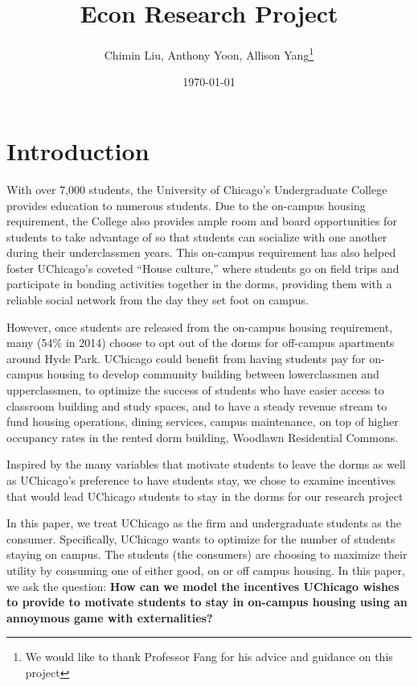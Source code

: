 \documentclass[12pt]{article}
\title{Econ Research Project}
\author{Chimin Liu, Anthony Yoon, Allison Yang\thanks{We would like to thank Professor Fang for his advice and guidance on this project}}
\date{\today}
\begin{document}
\maketitle
\tableofcontents
\newpage
\section{Introduction}
With over 7,000 students, the University of Chicago’s Undergraduate College provides education to numerous students. Due to the on-campus housing requirement, the College also provides ample room and board opportunities for students to take advantage of so that students can socialize with one another during their underclassmen years. This on-campus requirement has also helped foster UChicago’s coveted “House culture,” where students go on field trips and participate in bonding activities together in the dorms, providing them with a reliable social network from the day they set foot on campus.


However, once students are released from the on-campus housing requirement, many (54\% in 2014) choose to opt out of the dorms for off-campus apartments around Hyde Park. UChicago could benefit from having students pay for on-campus housing to develop community building between lowerclassmen and upperclassmen, to optimize the success of students who have easier access to classroom building and study spaces, and to have a steady revenue stream to fund housing operations, dining services, campus maintenance, on top of higher occupancy rates in the rented dorm building, Woodlawn Residential Commons. 


Inspired by the many variables that motivate students to leave the dorms as well as UChicago’s preference to have students stay, we chose to examine incentives that would lead UChicago students to stay in the dorms for our research project


In this paper, we treat UChicago as the firm and undergraduate students as the consumer. Specifically, UChicago wants to optimize for the number of students staying on campus. The students (the consumers) are choosing to maximize their utility by consuming one of either good, on or off campus housing. In this paper, we ask the question: \textbf{How can we model the incentives UChicago wishes to provide to motivate students to stay in on-campus housing using an annoymous game with externalities?}
\end{document}
